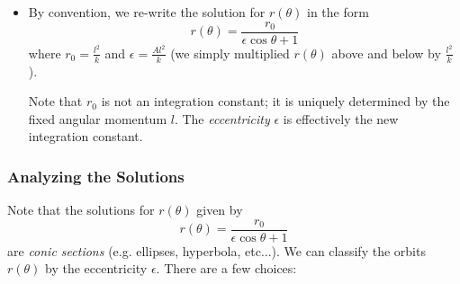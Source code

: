 \documentclass[11pt, a4paper]{article}
\begin{document}
\begin{itemize}
	\item By convention, we re-write the solution for $ r(\theta) $ in the form
	\begin{equation*}
		r(\theta) = \frac{r_{0}}{\epsilon \cos \theta + 1}
	\end{equation*}
	where $ r_{0} = \frac{l^{2}}{k} $ and $ \epsilon = \frac{Al^{2}}{k} $ (we simply multiplied $ r(\theta) $ above and below by $ \frac{l^{2}}{k} $).
	
	Note that $ r_{0} $ is not an integration constant; it is uniquely determined by the fixed angular momentum $ l $. The \textit{eccentricity} $\epsilon$ is effectively the new integration constant.

\end{itemize}

\subsubsection{Analyzing the Solutions}
Note that the solutions for $ r(\theta) $ given by
\begin{equation*}
	r(\theta) = \frac{r_{0}}{\epsilon \cos \theta + 1}
\end{equation*}
are \textit{conic sections} (e.g. ellipses, hyperbola, etc...). We can classify the orbits $ r(\theta) $ by the eccentricity $ \epsilon $. There are a few choices:
\end{document}
